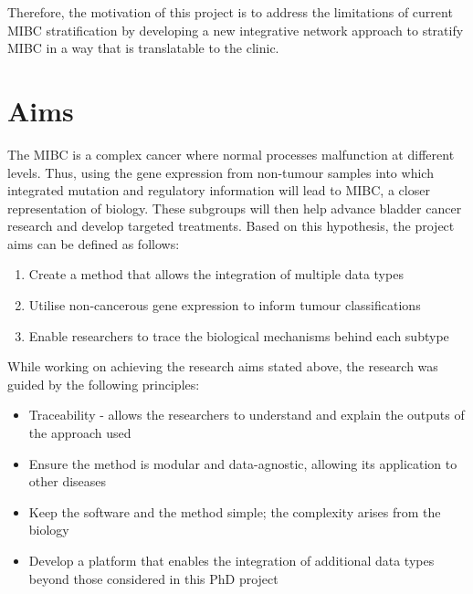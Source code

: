 Therefore, the motivation of this project is to address the limitations of current \gls{MIBC} stratification by developing a new integrative network approach to stratify \gls{MIBC} in a way that is translatable to the clinic.




\section{Aims} \label{s:intro:aims}



The MIBC is a complex cancer where normal processes malfunction at different levels. Thus, using the gene expression from non-tumour samples into which integrated mutation and regulatory information will lead to MIBC, a closer representation of biology. These subgroups will then help advance bladder cancer research and develop targeted treatments. Based on this hypothesis, the project aims can be defined as follows:

\begin{enumerate}
    \item Create a method that allows the integration of multiple data types
    \item Utilise non-cancerous gene expression to inform tumour classifications
    \item Enable researchers to trace the biological mechanisms behind each subtype
\end{enumerate}

While working on achieving the research aims stated above, the research was guided by the following principles:

\begin{itemize}
    \item Traceability - allows the researchers to understand and explain the outputs of the approach used
    \item Ensure the method is modular and data-agnostic, allowing its application to other diseases
    \item Keep the software and the method simple; the complexity arises from the biology
    \item Develop a platform that enables the integration of additional data types beyond those considered in this PhD project
\end{itemize}

